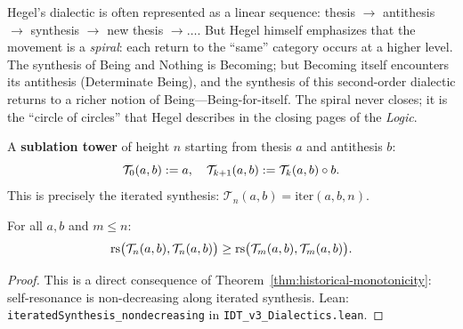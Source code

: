 Hegel's dialectic is often represented as a linear sequence: thesis $\to$
antithesis $\to$ synthesis $\to$ new thesis $\to \ldots$. But Hegel himself
emphasizes that the movement is a \emph{spiral}: each return to the ``same''
category occurs at a higher level. The synthesis of Being and Nothing is
Becoming; but Becoming itself encounters its antithesis (Determinate Being),
and the synthesis of this second-order dialectic returns to a richer notion
of Being---Being-for-itself. The spiral never closes; it is the ``circle of
circles'' that Hegel describes in the closing pages of the \textit{Logic}.

\begin{definition}
\label{def:sublation-tower}
A \textbf{sublation tower} of height $n$ starting from thesis $a$ and antithesis $b$:
\[
\mathcal{T}_0(a, b) := a, \quad
\mathcal{T}_{k+1}(a, b) := \mathcal{T}_k(a, b) \circ b.
\]
This is precisely the iterated synthesis: $\mathcal{T}_n(a, b) = \mathrm{iter}(a, b, n)$.
\end{definition}

\begin{theorem}
\label{thm:sublation-mono}
For all $a, b$ and $m \leq n$:
\[
\mathrm{rs}\bigl(\mathcal{T}_n(a, b), \mathcal{T}_n(a, b)\bigr) \geq
\mathrm{rs}\bigl(\mathcal{T}_m(a, b), \mathcal{T}_m(a, b)\bigr).
\]
\end{theorem}

\begin{proof}
This is a direct consequence of Theorem~\ref{thm:historical-monotonicity}:
self-resonance is non-decreasing along iterated synthesis.
Lean: \texttt{iteratedSynthesis\_nondecreasing} in
\texttt{IDT\_v3\_Dialectics.lean}.
\end{proof}

